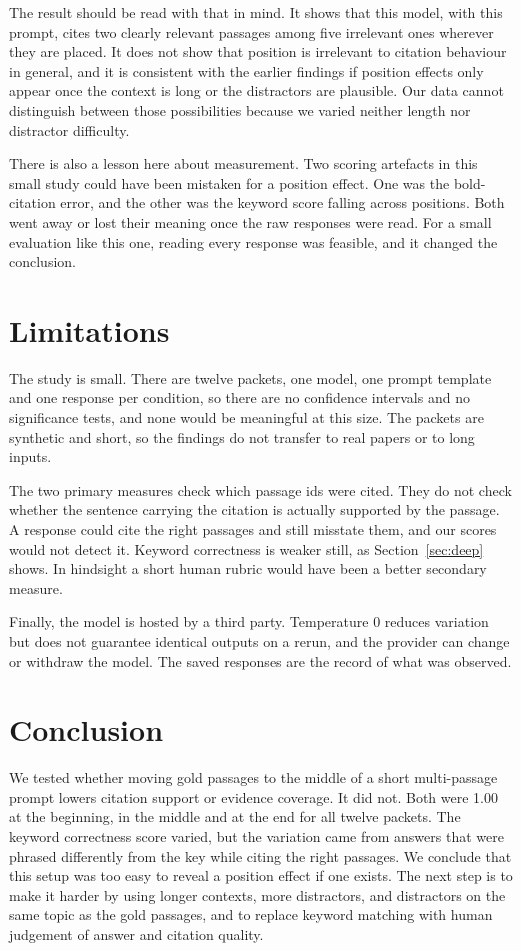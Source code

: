 \documentclass[11pt,a4paper]{article}
\begin{document}
The result should be read with that in mind.
It shows that this model, with this prompt, cites two clearly relevant passages among five irrelevant ones wherever they are placed.
It does not show that position is irrelevant to citation behaviour in general,
and it is consistent with the earlier findings if position effects only appear once the context is long or the distractors are plausible.
Our data cannot distinguish between those possibilities because we varied neither length nor distractor difficulty.

There is also a lesson here about measurement.
Two scoring artefacts in this small study could have been mistaken for a position effect.
One was the bold-citation error, and the other was the keyword score falling across positions.
Both went away or lost their meaning once the raw responses were read.
For a small evaluation like this one, reading every response was feasible, and it changed the conclusion.

\section{Limitations}
\label{sec:limits}

The study is small.
There are twelve packets, one model, one prompt template and one response per condition,
so there are no confidence intervals and no significance tests, and none would be meaningful at this size.
The packets are synthetic and short, so the findings do not transfer to real papers or to long inputs.

The two primary measures check which passage ids were cited.
They do not check whether the sentence carrying the citation is actually supported by the passage.
A response could cite the right passages and still misstate them, and our scores would not detect it.
Keyword correctness is weaker still, as Section~\ref{sec:deep} shows.
In hindsight a short human rubric would have been a better secondary measure.

Finally, the model is hosted by a third party.
Temperature 0 reduces variation but does not guarantee identical outputs on a rerun,
and the provider can change or withdraw the model.
The saved responses are the record of what was observed.

\section{Conclusion}
\label{sec:concl}

We tested whether moving gold passages to the middle of a short multi-passage prompt lowers citation support or evidence coverage.
It did not.
Both were 1.00 at the beginning, in the middle and at the end for all twelve packets.
The keyword correctness score varied, but the variation came from answers that were phrased differently from the key while citing the right passages.
We conclude that this setup was too easy to reveal a position effect if one exists.
The next step is to make it harder by using longer contexts, more distractors, and distractors on the same topic as the gold passages,
and to replace keyword matching with human judgement of answer and citation quality.
\end{document}
